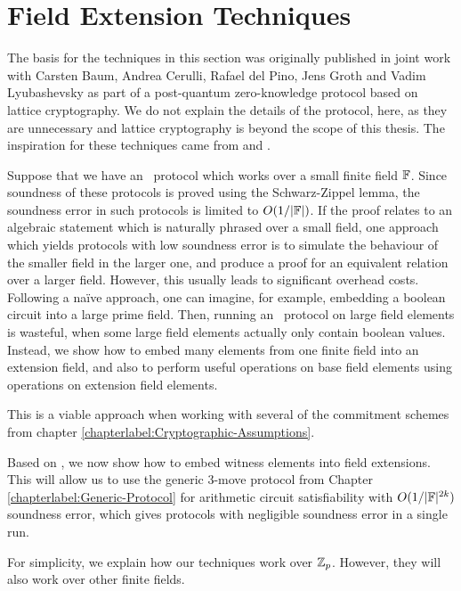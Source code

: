 \section{Field Extension Techniques}\label{sec:fieldext}

The basis for the techniques in this section was originally published in joint work \cite{BootleCCGP16} with Carsten Baum, Andrea Cerulli, Rafael del Pino, Jens Groth and Vadim Lyubashevsky as part of a post-quantum zero-knowledge protocol based on lattice cryptography. We do not explain the details of the protocol, here, as they are unnecessary and lattice cryptography is beyond the scope of this thesis. The inspiration for these techniques came from \cite{CramerDK14} and \cite{CramerDP12}.

Suppose that we have an \ILC\ protocol which works over a small finite field $\mathbb{F}$. Since soundness of these protocols is proved using the Schwarz-Zippel lemma, the soundness error in such protocols is limited to $O(1 / |\mathbb{F}|)$. If the proof relates to an algebraic statement which is naturally phrased over a small field, one approach which yields protocols with low soundness error is to simulate the behaviour of the smaller field in the larger one, and produce a proof for an equivalent relation over a larger field. However, this usually leads to significant overhead costs. Following a na\"{i}ve approach, one can imagine, for example, embedding a boolean circuit into a large prime field. Then, running an \ILC\ protocol on large field elements is wasteful, when some large field elements actually only contain boolean values. Instead, we show how to embed many elements from one finite field into an extension field, and also to perform useful operations on base field elements using operations on extension field elements.

This is a viable approach when working with several of the commitment schemes from chapter \ref{chapterlabel:Cryptographic-Assumptions}.

Based on \cite{BaumBCPGL18}, we now show how to embed witness elements into field extensions. This will allow us to use the generic 3-move protocol from Chapter \ref{chapterlabel:Generic-Protocol} for arithmetic circuit satisfiability with $O(1/|\mathbb{F}|^{2k})$ soundness error, which gives protocols with negligible soundness error in a single run.

For simplicity, we explain how our techniques work over $\mathbb{Z}_p$. However, they will also work over other finite fields.


